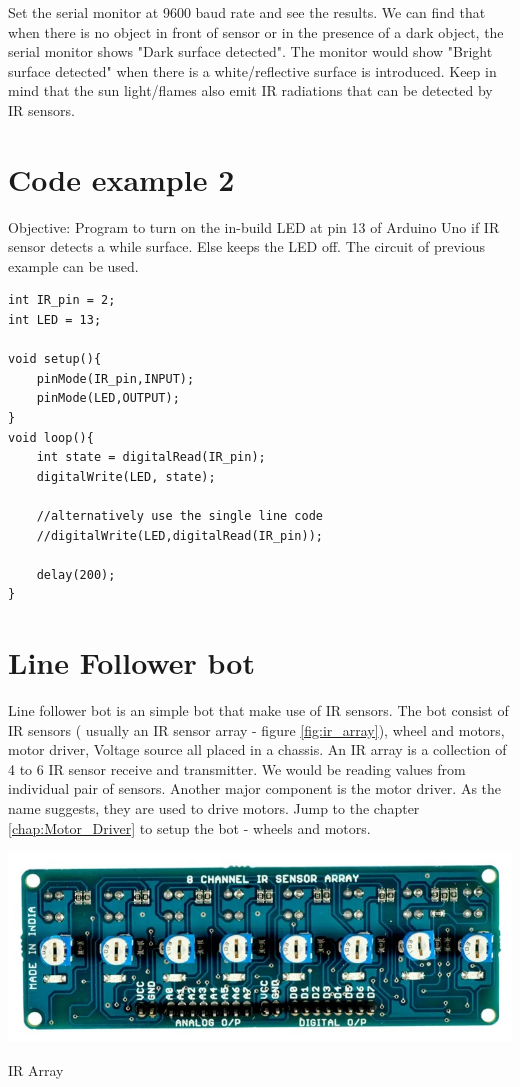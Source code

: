 \par Set the serial monitor at 9600 baud rate and see the results. We can find that when there is no object in front of sensor or in the presence of a dark object, the serial monitor shows "Dark surface detected". The monitor would show "Bright surface detected" when there is a white/reflective surface is introduced. Keep in mind that the sun light/flames also emit \ac{IR} radiations that can be detected by \ac{IR} sensors.

\section{\textbf{Code example 2}}
Objective: Program to turn on the in-build LED at pin 13 of Arduino Uno if \ac{IR} sensor detects a while surface. Else keeps the LED off. The circuit of previous example can be used.

\begin{lstlisting}[style=CStyle]
int IR_pin = 2;
int LED = 13;

void setup(){
    pinMode(IR_pin,INPUT);
    pinMode(LED,OUTPUT);
}
void loop(){
    int state = digitalRead(IR_pin);
    digitalWrite(LED, state);
    
    //alternatively use the single line code
    //digitalWrite(LED,digitalRead(IR_pin));
    
    delay(200);
}
\end{lstlisting}


\section{Line Follower bot}

\par Line follower bot is an simple bot that make use of \ac{IR} sensors. The bot consist of \ac{IR} sensors ( usually an \ac{IR} sensor array - figure \ref{fig:ir_array}), wheel and motors, motor driver, Voltage source all placed in a chassis. An \ac{IR} array is a collection of 4 to 6 \ac{IR} sensor receive and transmitter. We would be reading values from individual pair of sensors. Another major component is the motor driver. As the name suggests, they are used to drive motors. Jump to the chapter \ref{chap:Motor_Driver} to setup the bot - wheels and motors.

\begin{marginfigure}	
	\includegraphics{Images/IR Sensor/IR_array.png}
	\caption{\ac{IR} Array}
	\label{fig:ir_array}
\end{marginfigure}

